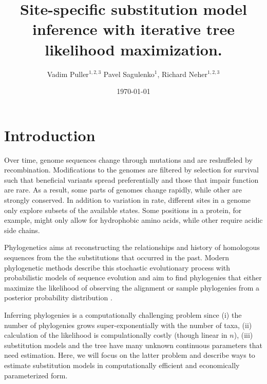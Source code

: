 \documentclass[aps,rmp, onecolumn]{revtex4}
\begin{document}
\title{Site-specific substitution model inference with iterative tree likelihood maximization.}
\author{Vadim Puller$^{1,2,3}$ Pavel Sagulenko$^{1}$, Richard Neher$^{1,2,3}$}

\date{\today}

\maketitle

\section*{Introduction}
Over time, genome sequences change through mutations and are reshuffeled by recombination.
Modifications to the genomes are filtered by selection for survival such that beneficial variants spread preferentially and those that impair function are rare.
As a result, some parts of genomes change rapidly, while other are strongly conserved.
In addition to variation in rate, different sites in a genome only explore subsets of the available states.
Some positions in a protein, for example, might only allow for hydrophobic amino acids, while other require acidic side chains.

Phylogenetics aims at reconstructing the relationships and history of homologous sequences from the the substitutions that occurred in the past.
Modern phylogenetic methods describe this stochastic evolutionary process with probabilistic models of sequence evolution and aim to find phylogenies that either maximize the likelihood of observing the alignment or sample phylogenies from a posterior probability distribution \citep{felsenstein2004inferring}.

Inferring phylogenies is a computationally challenging problem since (i) the number of phylogenies grows super-exponentially with the number of taxa, (ii) calculation of the likelihood is compulationally costly (though linear in $n$), (iii) substitution models and the tree have many unknown continuous parameters that need estimation.
Here, we will focus on the latter problem and describe ways to estimate substitution models in computationally efficient and economically parameterized form.
\end{document}
